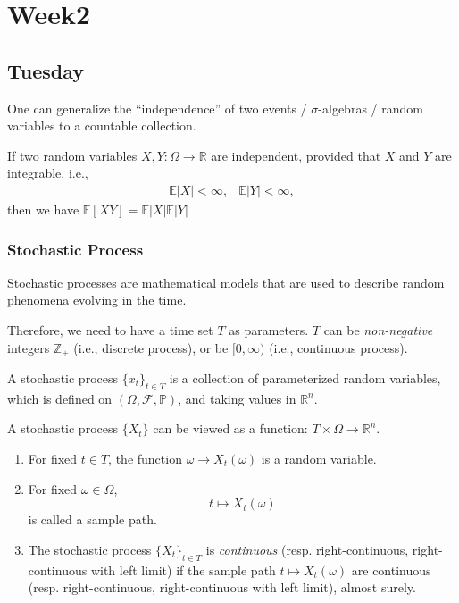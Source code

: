 
\chapter{Week2}

\section{Tuesday}
\begin{remark}
One can generalize the ``independence'' of two events / $\sigma$-algebras / random variables to a countable collection.
\end{remark}

\begin{example}
If two random variables $X,Y:\Omega\to\mathbb{R}$ are independent, provided that $X$ and $Y$ are integrable, i.e.,
\[
\begin{array}{ll}
\mathbb{E}|X|<\infty,
&
\mathbb{E}|Y|<\infty,
\end{array}
\]
then we have $\mathbb{E}[XY]=\mathbb{E}|X|\mathbb{E}|Y|$
\end{example}
\subsection{Stochastic Process}
Stochastic processes are mathematical models that are used to describe random phenomena evolving in the time. 

Therefore, we need to have a time set $T$ as parameters. $T$ can be \emph{non-negative} integers $\mathbb{Z}_+$ (i.e., discrete process), or be $[0,\infty)$ (i.e., continuous process). 

\begin{definition}
A stochastic process $\{x_t\}_{t\in T}$ is a collection of parameterized random variables, which is defined on $(\Omega,\mathcal{F},\mathbb{P})$, and taking values in $\mathbb{R}^n$.
\end{definition}
\begin{remark}
A stochastic process $\{X_t\}$ can be viewed as a function: $T\times\Omega\to\mathbb{R}^n$.
\end{remark}

\begin{definition}
\begin{enumerate}
\item
For fixed $t\in T$, the function $\omega\to X_t(\omega)$ is a random variable.
\item
For fixed $\omega\in\Omega$, 
\[
t\mapsto X_t(\omega)
\]
is called a sample path.
\item
The stochastic process $\{X_t\}_{t\in T}$ is \emph{continuous} (resp. right-continuous, right-continuous with left limit) if the sample path $t\mapsto X_t(\omega)$ are continuous (resp. right-continuous, right-continuous with left limit), almost surely.
\end{enumerate}
\end{definition}

